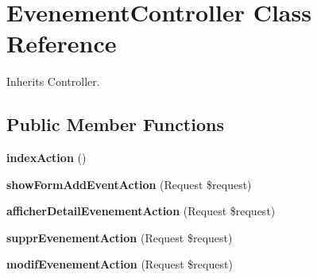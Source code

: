 \hypertarget{class_site_1_1_trail_bundle_1_1_controller_1_1_evenement_controller}{}\section{Evenement\+Controller Class Reference}
\label{class_site_1_1_trail_bundle_1_1_controller_1_1_evenement_controller}


Inherits Controller.

\subsection*{Public Member Functions}
\begin{DoxyCompactItemize}
\item 
\hypertarget{class_site_1_1_trail_bundle_1_1_controller_1_1_evenement_controller_a04f2101fe1cdc785b61219c2df753024}{}{\bfseries index\+Action} ()\label{class_site_1_1_trail_bundle_1_1_controller_1_1_evenement_controller_a04f2101fe1cdc785b61219c2df753024}

\item 
\hypertarget{class_site_1_1_trail_bundle_1_1_controller_1_1_evenement_controller_a9db5e34136200883843046c97347dc23}{}{\bfseries show\+Form\+Add\+Event\+Action} (Request \$request)\label{class_site_1_1_trail_bundle_1_1_controller_1_1_evenement_controller_a9db5e34136200883843046c97347dc23}

\item 
\hypertarget{class_site_1_1_trail_bundle_1_1_controller_1_1_evenement_controller_a86eec0040d25a90af7df6fbb9ef62f32}{}{\bfseries afficher\+Detail\+Evenement\+Action} (Request \$request)\label{class_site_1_1_trail_bundle_1_1_controller_1_1_evenement_controller_a86eec0040d25a90af7df6fbb9ef62f32}

\item 
\hypertarget{class_site_1_1_trail_bundle_1_1_controller_1_1_evenement_controller_ad7eaba2c203d8e27f141ed8d62c69054}{}{\bfseries suppr\+Evenement\+Action} (Request \$request)\label{class_site_1_1_trail_bundle_1_1_controller_1_1_evenement_controller_ad7eaba2c203d8e27f141ed8d62c69054}

\item 
\hypertarget{class_site_1_1_trail_bundle_1_1_controller_1_1_evenement_controller_a69b0c28abccd271f6158dd477baa7cc9}{}{\bfseries modif\+Evenement\+Action} (Request \$request)\label{class_site_1_1_trail_bundle_1_1_controller_1_1_evenement_controller_a69b0c28abccd271f6158dd477baa7cc9}


\end{DoxyCompactItemize}
